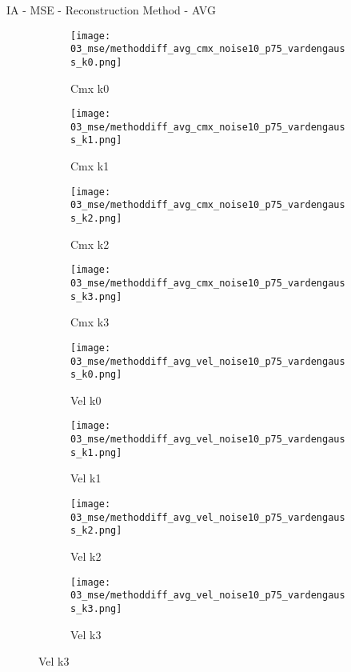 \documentclass{beamer}
\begin{document}
\begin{frame}{IA - MSE - Reconstruction Method - AVG}{}
\begin{figure}
\begin{subfigure}{0.24\textwidth}
\texttt{[image: 03\_mse/methoddiff\_avg\_cmx\_noise10\_p75\_vardengauss\_k0.png]}
\vspace{-20pt}
\caption*{\tiny Cmx k0}
\end{subfigure}
\begin{subfigure}{0.24\textwidth}
\texttt{[image: 03\_mse/methoddiff\_avg\_cmx\_noise10\_p75\_vardengauss\_k1.png]}
\vspace{-20pt}
\caption*{\tiny Cmx k1}
\end{subfigure}
\begin{subfigure}{0.24\textwidth}
\texttt{[image: 03\_mse/methoddiff\_avg\_cmx\_noise10\_p75\_vardengauss\_k2.png]}
\vspace{-20pt}
\caption*{\tiny Cmx k2}
\end{subfigure}
\begin{subfigure}{0.24\textwidth}
\texttt{[image: 03\_mse/methoddiff\_avg\_cmx\_noise10\_p75\_vardengauss\_k3.png]}
\vspace{-20pt}
\caption*{\tiny Cmx k3}
\end{subfigure}

\begin{subfigure}{0.24\textwidth}
\texttt{[image: 03\_mse/methoddiff\_avg\_vel\_noise10\_p75\_vardengauss\_k0.png]}
\vspace{-20pt}
\caption*{\tiny Vel k0}
\end{subfigure}
\begin{subfigure}{0.24\textwidth}
\texttt{[image: 03\_mse/methoddiff\_avg\_vel\_noise10\_p75\_vardengauss\_k1.png]}
\vspace{-20pt}
\caption*{\tiny Vel k1}
\end{subfigure}
\begin{subfigure}{0.24\textwidth}
\texttt{[image: 03\_mse/methoddiff\_avg\_vel\_noise10\_p75\_vardengauss\_k2.png]}
\vspace{-20pt}
\caption*{\tiny Vel k2}
\end{subfigure}
\begin{subfigure}{0.24\textwidth}
\texttt{[image: 03\_mse/methoddiff\_avg\_vel\_noise10\_p75\_vardengauss\_k3.png]}
\vspace{-20pt}
\caption*{\tiny Vel k3}
\end{subfigure}
\end{figure}
\end{frame}
\end{document}
